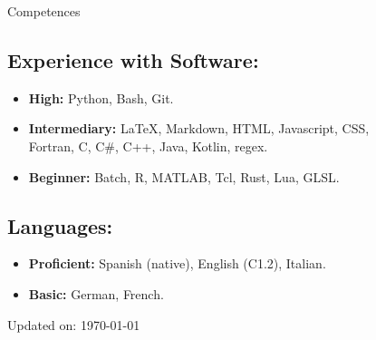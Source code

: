 \begin{rSection}{Competences}
    \vspace{\baselineskip}
    \subsection*{Experience with Software:}
    \begin{itemize}
        \item \textbf{High:} Python, Bash, Git.
        \item \textbf{Intermediary:} LaTeX, Markdown, HTML, Javascript, CSS, \\ Fortran, C, C\#, C++, Java, Kotlin, regex.
        \item \textbf{Beginner:} Batch, R, MATLAB, Tcl, Rust, Lua, GLSL.
    \end{itemize}

    \subsection*{Languages:}
    \begin{itemize}
        \item \textbf{Proficient:} Spanish (native), English (C1.2), Italian.
        \item \textbf{Basic:} German, French.
    \end{itemize}
\end{rSection}

\begin{flushright} \small{Updated on: \today} \end{flushright}


